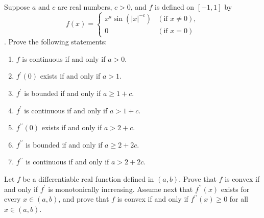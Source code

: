   \begin{exercise}[Rudin 5.13]
    Suppose $a$ and $c$ are real numbers, $c > 0$, and $f$ is defined on $[-1, 1]$ by
    \begin{equation}
      f(x) = 
      \begin{cases}
        x^a \sin(|x|^{-c}) & (\text{if } x \ne 0), \\
        0 & (\text{if } x = 0)
      \end{cases}
    \end{equation}
   . Prove the following statements:
    \begin{enumerate}
      \item[(a)] $f$ is continuous if and only if $a > 0$.
      \item[(b)] $f^\prime(0)$ exists if and only if $a > 1$.
      \item[(c)] $f^\prime$ is bounded if and only if $a \ge 1 + c$.
      \item[(d)] $f^\prime$ is continuous if and only if $a > 1 + c$.
      \item[(e)] $f^{\prime\prime}(0)$ exists if and only if $a > 2 + c$.
      \item[(f)] $f^{\prime\prime}$ is bounded if and only if $a \ge 2 + 2c$.
      \item[(g)] $f^{\prime\prime}$ is continuous if and only if $a > 2 + 2c$.
    \end{enumerate}
  \end{exercise}
  \begin{solution}

  \end{solution}

  \begin{exercise}[Rudin 5.14]
    Let $f$ be a differentiable real function defined in $(a, b)$. Prove that $f$ is convex if and only if $f^\prime$ is monotonically increasing. Assume next that $f^{\prime\prime}(x)$ exists for every $x \in (a, b)$, and prove that $f$ is convex if and only if $f^{\prime\prime}(x) \ge 0$ for all $x \in (a, b)$.
  \end{exercise}
  \begin{solution}

  \end{solution}

